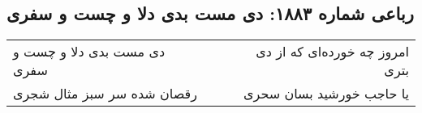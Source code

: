 \begin{center}
\section*{رباعی شماره ۱۸۸۳: دی مست بدی دلا و چست و سفری}
\label{sec:1883}
\begin{longtable}{l p{0.5cm} r}
دی مست بدی دلا و چست و سفری
&&
امروز چه خورده‌ای که از دی بتری
\\
رقصان شده سر سبز مثال شجری
&&
یا حاجب خورشید بسان سحری
\\
\end{longtable}
\end{center}
